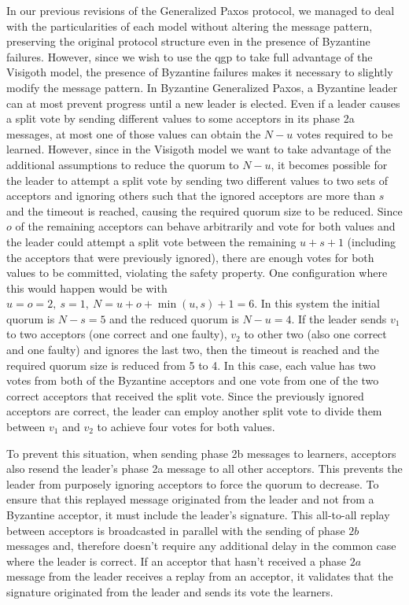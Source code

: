 In our previous revisions of the Generalized Paxos protocol, we managed to deal with the particularities of each model without altering the message pattern, preserving the original protocol structure even in the presence of Byzantine failures. However, since we wish to use the \acrshort{qgp} to take full advantage of the Visigoth model, the presence of Byzantine failures makes it necessary to slightly modify the message pattern. In Byzantine Generalized Paxos, a Byzantine leader can at most prevent progress until a new leader is elected. Even if a leader causes a split vote by sending different values to some acceptors in its phase 2a messages, at most one of those values can obtain the $N-u$ votes required to be learned. However, since in the Visigoth model we want to take advantage of the additional assumptions to reduce the quorum to $N-u$, it becomes possible for the leader to attempt a split vote by sending two different values to two sets of acceptors and ignoring others such that the ignored acceptors are more than $s$ and the timeout is reached, causing the required quorum size to be reduced. Since $o$ of the remaining acceptors can behave arbitrarily and vote for both values and the leader could attempt a split vote between the remaining $u+s+1$ (including the acceptors that were previously ignored), there are enough votes for both values to be committed, violating the safety property. One configuration where this would happen would be with $u=o=2,\ s=1,\ N=u+o+\min(u,s)+1=6$. In this system the initial quorum is $N-s=5$ and the reduced quorum is $N-u=4$. If the leader sends $v_1$ to two acceptors (one correct and one faulty), $v_2$ to other two (also one correct and one faulty) and ignores the last two, then the timeout is reached and the required quorum size is reduced from 5 to 4. In this case, each value has two votes from both of the Byzantine acceptors and one vote from one of the two correct acceptors that received the split vote. Since the previously ignored acceptors are correct, the leader can employ another split vote to divide them between $v_1$ and $v_2$ to achieve four votes for both values. \par
To prevent this situation, when sending phase 2b messages to learners, acceptors also resend the leader's phase 2a message to all other acceptors. This prevents the leader from purposely ignoring acceptors to force the quorum to decrease. To ensure that this replayed message originated from the leader and not from a Byzantine acceptor, it must include the leader's signature. This all-to-all replay between acceptors is broadcasted in parallel with the sending of phase $2b$ messages and, therefore doesn't require any additional delay in the common case where the leader is correct. If an acceptor that hasn't received a phase $2a$ message from the leader receives a replay from an acceptor, it validates that the signature originated from the leader and sends its vote the learners.


